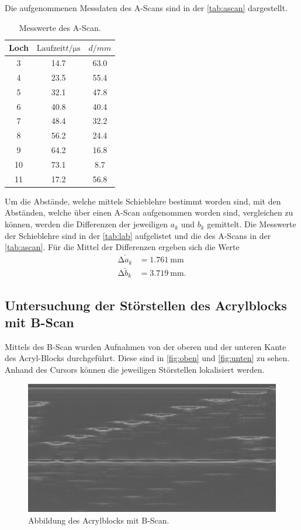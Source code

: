 Die aufgenommenen Messdaten des A-Scans sind in der \autoref{tab:ascan} dargestellt.
\begin{table}[H]
    \centering
    \caption{Messwerte des A-Scan.}
    \label{tab:ascan}
\begin{tabular}{c c c}
    \toprule
    Loch & $\text{Laufzeit} t / \si{\micro\second} $ & $ d/ \si{mm}$\\
    \midrule
     3 & 14.7 & 63.0 \\
     4 & 23.5 & 55.4 \\
     5 & 32.1 & 47.8 \\
     6 & 40.8 & 40.4 \\
     7 & 48.4 & 32.2 \\
     8 & 56.2 & 24.4 \\
     9 & 64.2 & 16.8 \\
    10 & 73.1 &  8.7 \\
    11 & 17.2 & 56.8 \\
    \bottomrule
\end{tabular}
\end{table}

Um die Abstände, welche mittels Schieblehre bestimmt worden sind, mit den Abständen, welche über einen A-Scan aufgenommen worden sind,
vergleichen zu können, werden die Differenzen der jeweiligen $a_k$ und $b_k$ gemittelt.
Die Messwerte der Schieblehre sind in der \autoref{tab:lab} aufgelistet und die des A-Scans in der \autoref{tab:ascan}.
Für die Mittel der Differenzen ergeben sich die Werte
\begin{align*}
\bar{\increment a_k} &= \SI{1.761}{\milli\meter} \\
\bar{\increment b_k} &= \SI{3.719}{\milli\meter}.
\end{align*}

\subsection{Untersuchung der Störstellen des Acrylblocks mit B-Scan}
\label{sec:Untersuchung der Störstellen des Aceylblocks mit B-Scan}

Mittels des B-Scan wurden Aufnahmen von der oberen und der unteren Kante des Acryl-Blocks durchgeführt.
Diese sind in \autoref{fig:oben} und \autoref{fig:unten} zu sehen. Anhand des Cursors können die jeweiligen Störstellen 
lokalisiert werden.

\begin{figure}[H]
    \centering
	\includegraphics[width=0.8\linewidth]{data/US1_daten/b_scan_oben.jpg}
    \captionsetup{width=0.765\linewidth}
	\caption{Abbildung des Acrylblocks mit B-Scan.}
	\label{fig:oben}
\end{figure}

